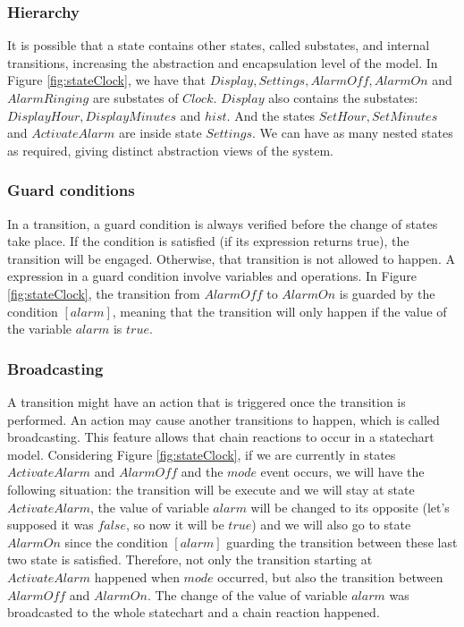 \subsubsection{Hierarchy}

It is possible that a state contains other states, called substates, and internal transitions, increasing the abstraction and encapsulation level of the model. In Figure \ref{fig:stateClock}, we have that $Display, Settings, AlarmOff, AlarmOn$ and $AlarmRinging$ are substates of $Clock$. $Display$ also contains the substates: $DisplayHour, DisplayMinutes$ and $hist$. And the states $SetHour, SetMinutes$ and $ActivateAlarm$ are inside state $Settings$. We can have as many nested states as required, giving distinct abstraction views of the system.

\subsubsection{Guard conditions}

In a transition, a guard condition is always verified before the change of states take place. If the condition is satisfied (if its expression returns true), the transition will be engaged. Otherwise, that transition is not allowed to happen. A expression in a guard condition involve variables and operations. In Figure \ref{fig:stateClock}, the transition from $AlarmOff$ to $AlarmOn$ is guarded by the condition $[alarm]$, meaning that the transition will only happen if the value of the variable $alarm$ is $true$.

\subsubsection{Broadcasting}

A transition might have an action that is triggered once the transition is performed.  An action may cause another transitions to happen, which is called broadcasting. This feature allows that chain reactions to occur in a statechart model. Considering Figure \ref{fig:stateClock}, if we are currently in states $ActivateAlarm$ and $AlarmOff$ and the $mode$ event occurs, we will have the following situation: the transition will be execute and we will stay at state $ActivateAlarm$, the value of variable $alarm$ will be changed to its opposite (let's supposed it was $false$, so now it will be $true$) and we will also go to state $AlarmOn$ since the condition $[alarm]$ guarding the transition between these last two state is satisfied. Therefore, not only the transition starting at $ActivateAlarm$ happened when $mode$ occurred, but also the transition between $AlarmOff$ and $AlarmOn$. The change of the value of variable $alarm$ was broadcasted to the whole statechart and a chain reaction happened.

